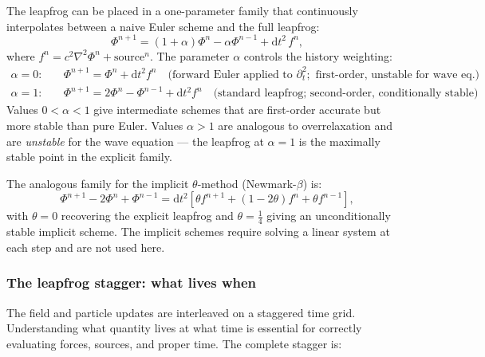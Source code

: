 \documentclass[11pt,a4paper]{article}
\newcommand{\dd}{\mathrm{d}}
\begin{document}
The leapfrog can be placed in a one-parameter family that continuously interpolates between a naive Euler scheme and the full leapfrog:
\begin{equation}
  \Phi^{n+1} = (1+\alpha)\Phi^n - \alpha\Phi^{n-1} + \dd t^2\,f^n,
\end{equation}
where $f^n = c^2\nabla^2\Phi^n + \mathrm{source}^n$.  The parameter $\alpha$ controls the history weighting:
\begin{align}
  \alpha = 0: &\quad \Phi^{n+1} = \Phi^n + \dd t^2 f^n \quad\text{(forward Euler applied to }\partial_t^2; \text{ first-order, unstable for wave eq.)} \\
  \alpha = 1: &\quad \Phi^{n+1} = 2\Phi^n - \Phi^{n-1} + \dd t^2 f^n \quad\text{(standard leapfrog; second-order, conditionally stable)}
\end{align}
Values $0 < \alpha < 1$ give intermediate schemes that are first-order accurate but more stable than pure Euler.  Values $\alpha > 1$ are analogous to overrelaxation and are \emph{unstable} for the wave equation --- the leapfrog at $\alpha=1$ is the maximally stable point in the explicit family.

The analogous family for the implicit $\theta$-method (Newmark-$\beta$) is:
\begin{equation}
  \Phi^{n+1} - 2\Phi^n + \Phi^{n-1} = \dd t^2\!\left[\theta f^{n+1} + (1-2\theta)f^n + \theta f^{n-1}\right],
\end{equation}
with $\theta=0$ recovering the explicit leapfrog and $\theta=\tfrac{1}{4}$ giving an unconditionally stable implicit scheme.  The implicit schemes require solving a linear system at each step and are not used here.

\subsubsection*{The leapfrog stagger: what lives when}

The field and particle updates are interleaved on a staggered time grid.  Understanding what quantity lives at what time is essential for correctly evaluating forces, sources, and proper time.  The complete stagger is:
\end{document}
